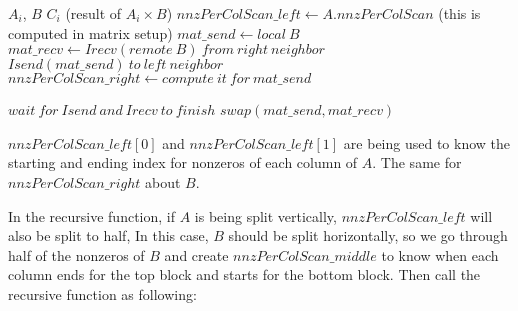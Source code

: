 \documentclass{article}
\newcommand{\recmm}{\textsc{recurs\_matmult}}
\begin{document}


\begin{algorithm}[H] 
  \caption{$C_i = A_i \times B$} \label{alg:part1} 
  \begin{algorithmic}[1]
    \Require $A_i$, $B$
    \Ensure  $C_i$ (result of $A_i \times B$)
    \State $nnzPerColScan\_left \gets A.nnzPerColScan$ (this is computed in matrix setup)
    \State $mat\_send \gets local\ B$
      \State $mat\_recv \gets Irecv(remote\ B)\ from\ right\ neighbor$
      \State $Isend(mat\_send)\ to\ left\ neighbor$
      \State $nnzPerColScan\_right \gets compute\ it\ for\ mat\_send$
      \State {}

      \State $wait\ for\ Isend\ and\ Irecv\ to\ finish$
      \State $swap(mat\_send,mat\_recv)$
    \EndFor
  \end{algorithmic}
\end{algorithm}

$nnzPerColScan\_left[0]$ and $nnzPerColScan\_left[1]$ are being used to know the starting and ending index for nonzeros of each column of $A$. The same for $nnzPerColScan\_right$ about $B$.

In the recursive function, if $A$ is being split vertically, $nnzPerColScan\_left$  will also be split to half, In this case, $B$ should be split horizontally, so we go through half of the nonzeros of $B$ and create $nnzPerColScan\_middle$ to know when each column ends for the top block and starts for the bottom block. Then call the recursive function as following:
\end{document}
